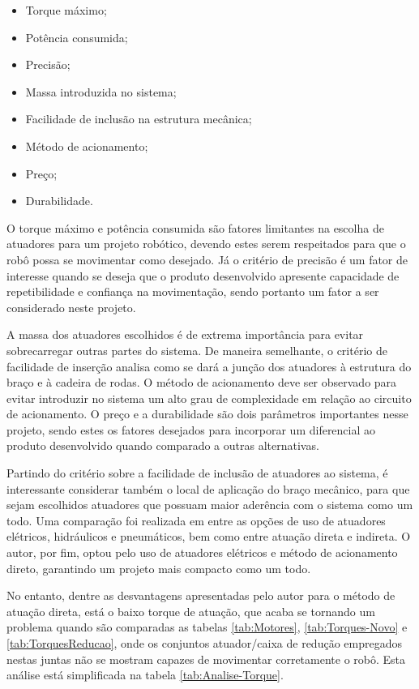 \begin{itemize}
    \item Torque máximo;
    \item Potência consumida;
    \item Precisão;
    \item Massa introduzida no sistema;
    \item Facilidade de inclusão na estrutura mecânica;
    \item Método de acionamento;
    \item Preço;
    \item Durabilidade.
\end{itemize}

O torque máximo e potência consumida são fatores limitantes na escolha de atuadores
para um projeto robótico, devendo estes serem respeitados para que o robô possa
se movimentar como desejado. Já o critério de precisão é um fator de interesse 
quando se deseja que o produto desenvolvido apresente capacidade de repetibilidade e 
confiança na movimentação, sendo portanto um fator a ser considerado neste projeto.

A massa dos atuadores escolhidos é de extrema importância para evitar sobrecarregar 
outras partes do sistema. De maneira semelhante, o critério de facilidade 
de inserção analisa como se dará a junção dos atuadores à estrutura do 
braço e à cadeira de rodas. O método de acionamento deve ser observado 
para evitar introduzir no sistema um alto grau de complexidade em relação 
ao circuito de acionamento. O preço e a durabilidade são dois parâmetros 
importantes nesse projeto, sendo estes os fatores desejados para incorporar
um diferencial ao produto desenvolvido quando comparado a outras alternativas.

Partindo do critério sobre a facilidade de inclusão de atuadores ao sistema, 
é interessante considerar também o local de aplicação do braço mecânico, 
para que sejam escolhidos atuadores que possuam maior aderência com o 
sistema como um todo. 
Uma comparação foi realizada em \cite{fernando2019assistivo} entre as 
opções de uso de atuadores elétricos, hidráulicos e pneumáticos, bem como
entre atuação direta e indireta. O autor, por fim, optou pelo uso de 
atuadores elétricos e método de acionamento direto, garantindo um projeto
mais compacto como um todo.

No entanto, dentre as desvantagens apresentadas pelo autor
para o método de atuação direta, está o baixo torque de atuação, que acaba
se tornando um problema quando são comparadas as tabelas \ref{tab:Motores},
\ref{tab:Torques-Novo} e \ref{tab:TorquesReducao}, onde os conjuntos 
atuador/caixa de redução empregados nestas juntas não se mostram capazes
de movimentar corretamente o robô. Esta análise está simplificada na 
tabela \ref{tab:Analise-Torque}.

